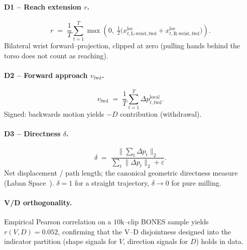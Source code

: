 \paragraph{D1 -- Reach extension $r$.}
\begin{equation}
  r \;=\; \frac{1}{T}\sum_{t=1}^{T}\max\!\left(0,\;\tfrac{1}{2}\bigl(x^{\text{loc}}_{t,\text{L-wrist},\text{fwd}}+x^{\text{loc}}_{t,\text{R-wrist},\text{fwd}}\bigr)\right).
  \label{eq:reach}
\end{equation}
Bilateral wrist forward--projection, clipped at zero (pulling hands behind
the torso does not count as reaching).

\paragraph{D2 -- Forward approach $v_{\text{fwd}}$.}
\begin{equation}
  v_{\text{fwd}} \;=\; \frac{1}{T}\sum_{t=1}^{T}\Delta p^{\text{local}}_{t,\text{fwd}}.
  \label{eq:vfwd}
\end{equation}
Signed: backwards motion yields $-D$ contribution (withdrawal).

\paragraph{D3 -- Directness $\delta$.}
\begin{equation}
  \delta \;=\; \frac{\bigl\|\sum_{t}\Delta p_t\bigr\|_2}{\sum_{t}\bigl\|\Delta p_t\bigr\|_2+\varepsilon}.
  \label{eq:delta}
\end{equation}
Net displacement / path length; the canonical geometric directness
measure (Laban Space~\cite{laban1947effort}). $\delta\!=\!1$ for a
straight trajectory, $\delta\!\to\!0$ for pure milling.

\paragraph{V/D orthogonality.}
Empirical Pearson correlation on a $10$k--clip BONES sample yields
$r(V,D) = 0.052$, confirming that the V--D disjointness designed into
the indicator partition (shape signals for $V$, direction signals for
$D$) holds in data.

\medskip

